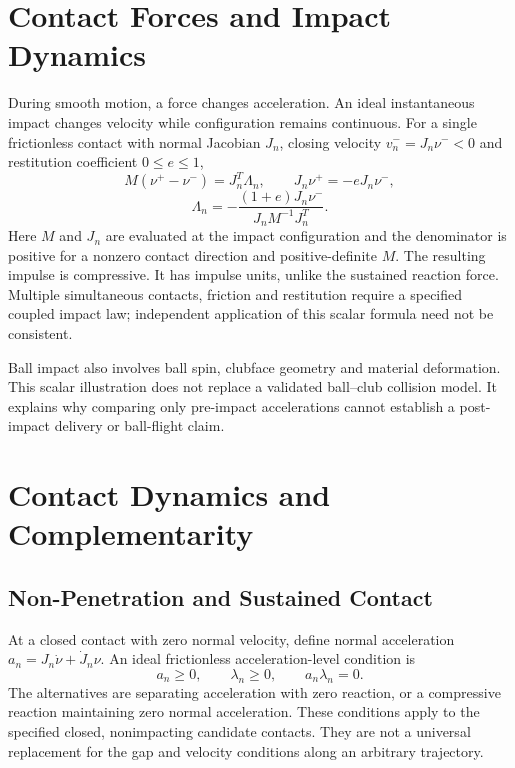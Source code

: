 \section{Contact Forces and Impact Dynamics}
\label{sec:contact_impact}

During smooth motion, a force changes acceleration. An ideal instantaneous impact changes velocity while configuration remains continuous. For a single frictionless contact with normal Jacobian $J_n$, closing velocity $v_n^-=J_n\nu^-<0$ and restitution coefficient $0\le e\le1$,
\begin{equation}
 M(\nu^+-\nu^-)=J_n^T\Lambda_n,\qquad
 J_n\nu^+=-eJ_n\nu^-,
\end{equation}
\begin{equation}
 \Lambda_n=-\frac{(1+e)J_n\nu^-}{J_nM^{-1}J_n^T}.
\end{equation}
Here $M$ and $J_n$ are evaluated at the impact configuration and the denominator is positive for a nonzero contact direction and positive-definite $M$. The resulting impulse is compressive. It has impulse units, unlike the sustained reaction force. Multiple simultaneous contacts, friction and restitution require a specified coupled impact law; independent application of this scalar formula need not be consistent.

Ball impact also involves ball spin, clubface geometry and material deformation. This scalar illustration does not replace a validated ball--club collision model. It explains why comparing only pre-impact accelerations cannot establish a post-impact delivery or ball-flight claim.

\section{Contact Dynamics and Complementarity}
\label{sec:contact_lcp}

\subsection{Non-Penetration and Sustained Contact}
\label{subsec:complementarity}

At a closed contact with zero normal velocity, define normal acceleration $a_n=J_n\dot\nu+\dot J_n\nu$. An ideal frictionless acceleration-level condition is
\begin{equation}
 a_n\ge0,\qquad\lambda_n\ge0,\qquad a_n\lambda_n=0.
 \label{eq:complementarity}
\end{equation}
The alternatives are separating acceleration with zero reaction, or a compressive reaction maintaining zero normal acceleration. These conditions apply to the specified closed, nonimpacting candidate contacts. They are not a universal replacement for the gap and velocity conditions along an arbitrary trajectory.

